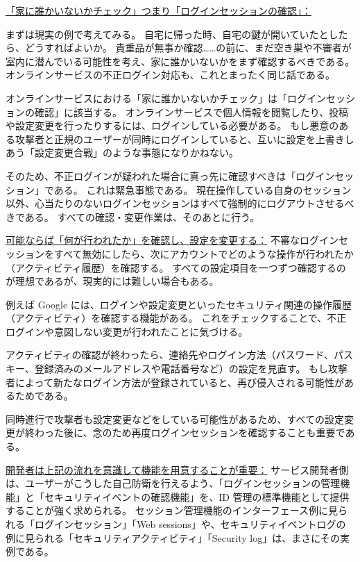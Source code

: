 \documentclass[uplatex]{jsarticle}
\def\label#1{}%
\begin{document}
\underline{「家に誰かいないかチェック」つまり「ログインセッションの確認」：}

\begin{exa}[自宅の鍵が開いていたら]\label{exa:ch3-house-unlocked}
まずは現実の例で考えてみる。
自宅に帰った時、自宅の鍵が開いていたとしたら、どうすればよいか。
貴重品が無事か確認……の前に、まだ空き巣や不審者が室内に潜んでいる可能性を考え、家に誰かいないかをまず確認するべきである。
オンラインサービスの不正ログイン対応も、これとまったく同じ話である。
\end{exa}

オンラインサービスにおける「家に誰かいないかチェック」は「ログインセッションの確認」に該当する。
オンラインサービスで個人情報を閲覧したり、投稿や設定変更を行ったりするには、ログインしている必要がある。
もし悪意のある攻撃者と正規のユーザーが同時にログインしていると、互いに設定を上書きしあう「設定変更合戦」のような事態になりかねない。

そのため、不正ログインが疑われた場合に真っ先に確認すべきは「ログインセッション」である。
これは緊急事態である。
現在操作している自身のセッション以外、心当たりのないログインセッションはすべて強制的にログアウトさせるべきである。
すべての確認・変更作業は、そのあとに行う。

\underline{可能ならば「何が行われたか」を確認し、設定を変更する：}
不審なログインセッションをすべて無効にしたら、次にアカウントでどのような操作が行われたか（アクティビティ履歴）を確認する。
すべての設定項目を一つずつ確認するのが理想であるが、現実的には難しい場合もある。

\begin{exa}[アクティビティ確認機能]\label{exa:ch3-google-activity}
例えば Google には、ログインや設定変更といったセキュリティ関連の操作履歴（アクティビティ）を確認する機能がある。
これをチェックすることで、不正ログインや意図しない変更が行われたことに気づける。
\end{exa}

アクティビティの確認が終わったら、連絡先やログイン方法（パスワード、パスキー、登録済みのメールアドレスや電話番号など）の設定を見直す。
もし攻撃者によって新たなログイン方法が登録されていると、再び侵入される可能性があるためである。

同時進行で攻撃者も設定変更などをしている可能性があるため、すべての設定変更が終わった後に、念のため再度ログインセッションを確認することも重要である。

\underline{開発者は上記の流れを意識して機能を用意することが重要：}
サービス開発者側は、ユーザーがこうした自己防衛を行えるよう、「ログインセッションの管理機能」と「セキュリティイベントの確認機能」を、ID 管理の標準機能として提供することが強く求められる。
セッション管理機能のインターフェース例に見られる「ログインセッション」「Web sessions」や、セキュリティイベントログの例に見られる「セキュリティアクティビティ」「Security log」は、まさにその実例である。
\end{document}
